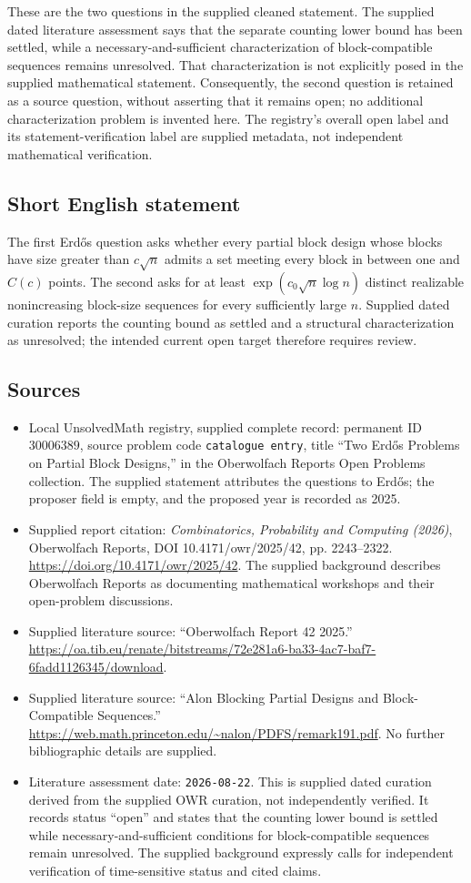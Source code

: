 \documentclass[11pt]{article}
\begin{document}
These are the two questions in the supplied cleaned statement. The supplied dated literature assessment says that the separate counting lower bound has been settled, while a necessary-and-sufficient characterization of block-compatible sequences remains unresolved. That characterization is not explicitly posed in the supplied mathematical statement. Consequently, the second question is retained as a source question, without asserting that it remains open; no additional characterization problem is invented here. The registry's overall open label and its statement-verification label are supplied metadata, not independent mathematical verification.
\subsection{Short English statement}
The first Erd\H{o}s question asks whether every partial block design whose blocks have size greater than \(c\sqrt n\) admits a set meeting every block in between one and \(C(c)\) points. The second asks for at least \(\exp(c_0\sqrt n\log n)\) distinct realizable nonincreasing block-size sequences for every sufficiently large \(n\). Supplied dated curation reports the counting bound as settled and a structural characterization as unresolved; the intended current open target therefore requires review.
\subsection{Sources}
\begin{itemize}
\item Local UnsolvedMath registry, supplied complete record: permanent ID \(30006389\), source problem code \texttt{catalogue entry}, title ``Two Erd\H{o}s Problems on Partial Block Designs,'' in the Oberwolfach Reports Open Problems collection. The supplied statement attributes the questions to Erd\H{o}s; the proposer field is empty, and the proposed year is recorded as 2025.
\item Supplied report citation: \emph{Combinatorics, Probability and Computing (2026)}, Oberwolfach Reports, DOI 10.4171/owr/2025/42, pp. 2243--2322. \url{https://doi.org/10.4171/owr/2025/42}. The supplied background describes Oberwolfach Reports as documenting mathematical workshops and their open-problem discussions.
\item Supplied literature source: ``Oberwolfach Report 42 2025.'' \url{https://oa.tib.eu/renate/bitstreams/72e281a6-ba33-4ac7-baf7-6fadd1126345/download}.
\item Supplied literature source: ``Alon Blocking Partial Designs and Block-Compatible Sequences.'' \url{https://web.math.princeton.edu/~nalon/PDFS/remark191.pdf}. No further bibliographic details are supplied.
\item Literature assessment date: \texttt{2026-08-22}. This is supplied dated curation derived from the supplied OWR curation, not independently verified. It records status ``open'' and states that the counting lower bound is settled while necessary-and-sufficient conditions for block-compatible sequences remain unresolved. The supplied background expressly calls for independent verification of time-sensitive status and cited claims.
\end{itemize}
\end{document}
